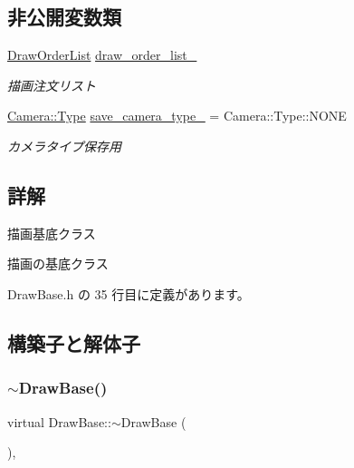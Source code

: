 \subsection*{非公開変数類}
\begin{DoxyCompactItemize}
\item 
\mbox{\hyperlink{class_draw_order_list}{Draw\+Order\+List}} \mbox{\hyperlink{class_draw_base_a6ebc8dc96176ddd3bd984b3d54739adb}{draw\+\_\+order\+\_\+list\+\_\+}}
\begin{DoxyCompactList}\small\item\em 描画注文リスト \end{DoxyCompactList}\item 
\mbox{\hyperlink{class_camera_a3b0a1f58deca679ac665f61c480d1dcb}{Camera\+::\+Type}} \mbox{\hyperlink{class_draw_base_aa8be4980756a0af7cc76dfe455c492d4}{save\+\_\+camera\+\_\+type\+\_\+}} = Camera\+::\+Type\+::\+N\+O\+NE
\begin{DoxyCompactList}\small\item\em カメラタイプ保存用 \end{DoxyCompactList}\end{DoxyCompactItemize}


\subsection{詳解}
描画基底クラス 

描画の基底クラス 

 Draw\+Base.\+h の 35 行目に定義があります。



\subsection{構築子と解体子}
\mbox{\label{class_draw_base_a799597f696c5cbf6074fb2655dea5e18}} 
\subsubsection{\texorpdfstring{$\sim$\+Draw\+Base()}{~DrawBase()}}
{\footnotesize\ttfamily virtual Draw\+Base\+::$\sim$\+Draw\+Base (\begin{DoxyParamCaption}{ }\end{DoxyParamCaption})\hspace{0.3cm}{\ttfamily [inline]}, {\ttfamily [virtual]}}



